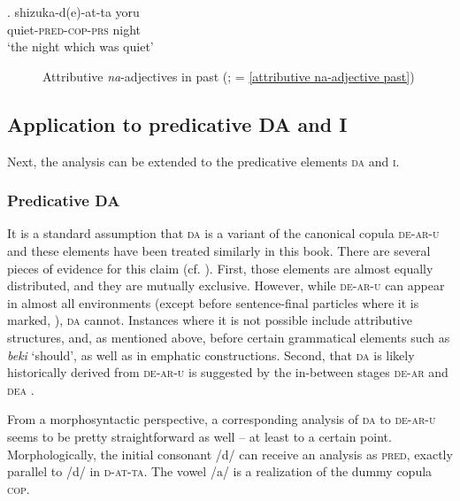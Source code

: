 \exg. shizuka-d(e)-at-ta yoru\\
quiet-\textsc{pred-cop-prs} night\\
`the night which was quiet' \label{attributive na-adjective past}

\begin{figure}
\centering
{}
\caption{Attributive \textit{na}-adjectives in past (\citealt[197]{nishiyama:1999:adj}; = \ref{attributive na-adjective past})}
\label{attributive na-adjective past tree}
\end{figure}

\subsection{Application to predicative DA and I} \label{kitoi}

Next, the analysis can be extended to the predicative elements \textsc{da} and \textsc{i}.

\subsubsection{Predicative DA}
\largerpage[1.5]
It is a standard assumption that \textsc{da} is a variant of the canonical copula \textsc{de-ar-u} \citep{urushibara:1993:syntactic} and these elements have been treated similarly in this book. There are several pieces of evidence for this claim (cf. \citealt{miyama:2011:da}). First, those elements are almost equally distributed, and they are mutually exclusive. However, while \textsc{de-ar-u} can appear in almost all environments (except before sentence-final particles where it is marked, \citealt[45–46]{miyama:2011:da}), \textsc{da} cannot. Instances where it is not possible include attributive structures, and, as mentioned above, before certain grammatical elements such as \textit{beki} `should’, as well as in emphatic constructions. Second, that \textsc{da} is likely historically derived from \textsc{de-ar-u} is suggested by the in-between stages \textsc{de-ar} and \textsc{dea} \citep{nakahara:2002:japanese}.

From a morphosyntactic perspective, a corresponding analysis of \textsc{da} to \textsc{de-ar-u} seems to be pretty straightforward as well -- at least to a certain point. Morphologically, the initial consonant /d/ can receive an analysis as \textsc{pred}, exactly parallel to /d/ in \textsc{d-at-ta}. The vowel /a/ is a realization of the dummy copula \textsc{cop}.

